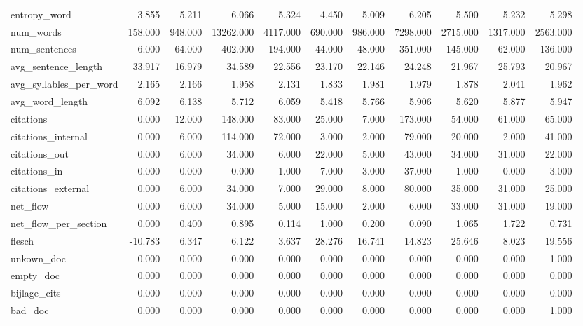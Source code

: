 \begin{tabular}{lrrrrrrrrrr}
\cline{1-11}
entropy\_word & 3.855 & 5.211 & 6.066 & 5.324 & 4.450 & 5.009 & 6.205 & 5.500 & 5.232 & 5.298 \\
\cline{1-11}
num\_words & 158.000 & 948.000 & 13262.000 & 4117.000 & 690.000 & 986.000 & 7298.000 & 2715.000 & 1317.000 & 2563.000 \\
\cline{1-11}
num\_sentences & 6.000 & 64.000 & 402.000 & 194.000 & 44.000 & 48.000 & 351.000 & 145.000 & 62.000 & 136.000 \\
\cline{1-11}
avg\_sentence\_length & 33.917 & 16.979 & 34.589 & 22.556 & 23.170 & 22.146 & 24.248 & 21.967 & 25.793 & 20.967 \\
\cline{1-11}
avg\_syllables\_per\_word & 2.165 & 2.166 & 1.958 & 2.131 & 1.833 & 1.981 & 1.979 & 1.878 & 2.041 & 1.962 \\
\cline{1-11}
avg\_word\_length & 6.092 & 6.138 & 5.712 & 6.059 & 5.418 & 5.766 & 5.906 & 5.620 & 5.877 & 5.947 \\
\cline{1-11}
citations & 0.000 & 12.000 & 148.000 & 83.000 & 25.000 & 7.000 & 173.000 & 54.000 & 61.000 & 65.000 \\
\cline{1-11}
citations\_internal & 0.000 & 6.000 & 114.000 & 72.000 & 3.000 & 2.000 & 79.000 & 20.000 & 2.000 & 41.000 \\
\cline{1-11}
citations\_out & 0.000 & 6.000 & 34.000 & 6.000 & 22.000 & 5.000 & 43.000 & 34.000 & 31.000 & 22.000 \\
\cline{1-11}
citations\_in & 0.000 & 0.000 & 0.000 & 1.000 & 7.000 & 3.000 & 37.000 & 1.000 & 0.000 & 3.000 \\
\cline{1-11}
citations\_external & 0.000 & 6.000 & 34.000 & 7.000 & 29.000 & 8.000 & 80.000 & 35.000 & 31.000 & 25.000 \\
\cline{1-11}
net\_flow & 0.000 & 6.000 & 34.000 & 5.000 & 15.000 & 2.000 & 6.000 & 33.000 & 31.000 & 19.000 \\
\cline{1-11}
net\_flow\_per\_section & 0.000 & 0.400 & 0.895 & 0.114 & 1.000 & 0.200 & 0.090 & 1.065 & 1.722 & 0.731 \\
\cline{1-11}
flesch & -10.783 & 6.347 & 6.122 & 3.637 & 28.276 & 16.741 & 14.823 & 25.646 & 8.023 & 19.556 \\
\cline{1-11}
unkown\_doc & 0.000 & 0.000 & 0.000 & 0.000 & 0.000 & 0.000 & 0.000 & 0.000 & 0.000 & 1.000 \\
\cline{1-11}
empty\_doc & 0.000 & 0.000 & 0.000 & 0.000 & 0.000 & 0.000 & 0.000 & 0.000 & 0.000 & 0.000 \\
\cline{1-11}
bijlage\_cits & 0.000 & 0.000 & 0.000 & 0.000 & 0.000 & 0.000 & 0.000 & 0.000 & 0.000 & 0.000 \\
\cline{1-11}
bad\_doc & 0.000 & 0.000 & 0.000 & 0.000 & 0.000 & 0.000 & 0.000 & 0.000 & 0.000 & 1.000 \\
\cline{1-11}
\bottomrule
\end{tabular}

